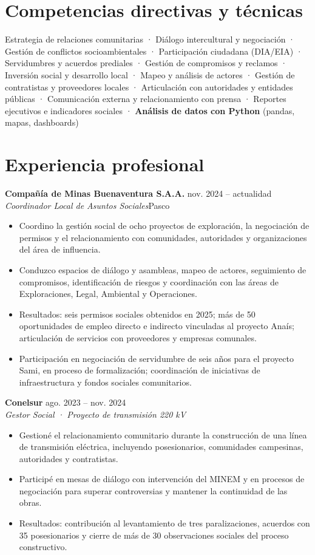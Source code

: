 \documentclass[10pt,a4paper]{article}
\newcommand{\trabajo}[4]{%
  \vspace{5pt}\textbf{#1} \hfill {\small\color{muted}#3}\\
  {\color{teal}\itshape #2}\hfill{\small\color{muted}#4}\par\vspace{1pt}}
\begin{document}
\section{Competencias directivas y técnicas}
Estrategia de relaciones comunitarias · Diálogo intercultural y negociación · Gestión de conflictos socioambientales · Participación ciudadana (DIA/EIA) · Servidumbres y acuerdos prediales · Gestión de compromisos y reclamos · Inversión social y desarrollo local · Mapeo y análisis de actores · Gestión de contratistas y proveedores locales · Articulación con autoridades y entidades públicas · Comunicación externa y relacionamiento con prensa · Reportes ejecutivos e indicadores sociales · \textbf{Análisis de datos con Python} (pandas, mapas, dashboards)

\section{Experiencia profesional}
\trabajo{Compañía de Minas Buenaventura S.A.A.}{Coordinador Local de Asuntos Sociales}{nov. 2024 – actualidad}{Pasco}
\begin{itemize}
  \item Coordino la gestión social de ocho proyectos de exploración, la negociación de permisos y el relacionamiento con comunidades, autoridades y organizaciones del área de influencia.
  \item Conduzco espacios de diálogo y asambleas, mapeo de actores, seguimiento de compromisos, identificación de riesgos y coordinación con las áreas de Exploraciones, Legal, Ambiental y Operaciones.
  \item Resultados: seis permisos sociales obtenidos en 2025; más de 50 oportunidades de empleo directo e indirecto vinculadas al proyecto Anaís; articulación de servicios con proveedores y empresas comunales.
  \item Participación en negociación de servidumbre de seis años para el proyecto Sami, en proceso de formalización; coordinación de iniciativas de infraestructura y fondos sociales comunitarios.
\end{itemize}

\trabajo{Conelsur}{Gestor Social · Proyecto de transmisión 220 kV}{ago. 2023 – nov. 2024}{}
\begin{itemize}
  \item Gestioné el relacionamiento comunitario durante la construcción de una línea de transmisión eléctrica, incluyendo posesionarios, comunidades campesinas, autoridades y contratistas.
  \item Participé en mesas de diálogo con intervención del MINEM y en procesos de negociación para superar controversias y mantener la continuidad de las obras.
  \item Resultados: contribución al levantamiento de tres paralizaciones, acuerdos con 35 posesionarios y cierre de más de 30 observaciones sociales del proceso constructivo.
\end{itemize}
\end{document}
